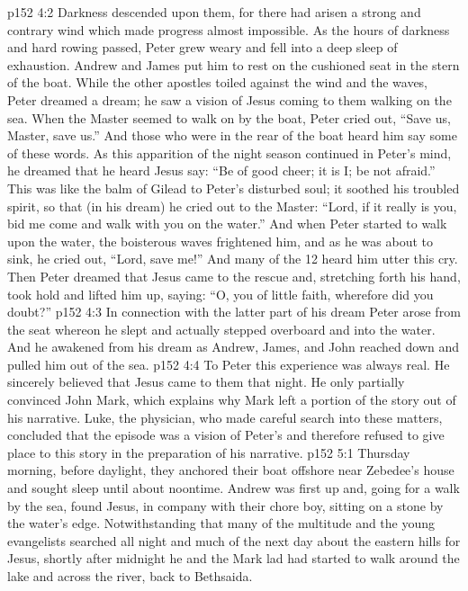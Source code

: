 \vs p152 4:2 Darkness descended upon them, for there had arisen a strong and contrary wind which made progress almost impossible. As the hours of darkness and hard rowing passed, Peter grew weary and fell into a deep sleep of exhaustion. Andrew and James put him to rest on the cushioned seat in the stern of the boat. While the other apostles toiled against the wind and the waves, Peter dreamed a dream; he saw a vision of Jesus coming to them walking on the sea. When the Master seemed to walk on by the boat, Peter cried out, “Save us, Master, save us.” And those who were in the rear of the boat heard him say some of these words. As this apparition of the night season continued in Peter’s mind, he dreamed that he heard Jesus say: “Be of good cheer; it is I; be not afraid.” This was like the balm of Gilead to Peter’s disturbed soul; it soothed his troubled spirit, so that (in his dream) he cried out to the Master: “Lord, if it really is you, bid me come and walk with you on the water.” And when Peter started to walk upon the water, the boisterous waves frightened him, and as he was about to sink, he cried out, “Lord, save me!” And many of the 12 heard him utter this cry. Then Peter dreamed that Jesus came to the rescue and, stretching forth his hand, took hold and lifted him up, saying: “O, you of little faith, wherefore did you doubt?”
\vs p152 4:3 In connection with the latter part of his dream Peter arose from the seat whereon he slept and actually stepped overboard and into the water. And he awakened from his dream as Andrew, James, and John reached down and pulled him out of the sea.
\vs p152 4:4 To Peter this experience was always real. He sincerely believed that Jesus came to them that night. He only partially convinced John Mark, which explains why Mark left a portion of the story out of his narrative. Luke, the physician, who made careful search into these matters, concluded that the episode was a vision of Peter’s and therefore refused to give place to this story in the preparation of his narrative.
\vs p152 5:1 Thursday morning, before daylight, they anchored their boat offshore near Zebedee’s house and sought sleep until about noontime. Andrew was first up and, going for a walk by the sea, found Jesus, in company with their chore boy, sitting on a stone by the water’s edge. Notwithstanding that many of the multitude and the young evangelists searched all night and much of the next day about the eastern hills for Jesus, shortly after midnight he and the Mark lad had started to walk around the lake and across the river, back to Bethsaida.
